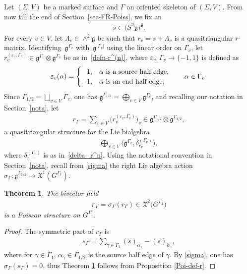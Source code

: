 \documentclass[10pt,a4paper]{amsart}
\numberwithin{equation}{section}
\newtheorem{Theorem}{Theorem}[section]
\newcommand{\XX}{\mathfrak{X}}
\def \g {\mathfrak{a}}
\def \g {\mathfrak{g}}
\def \sGam {{\scriptscriptstyle \Gamma}}
\newcommand{\calpha}{\check{\alpha}}
\begin{document}
Let $(\Sigma, V)$ be a marked surface and $\Gamma$ an oriented skeleton of $(\Sigma, V)$. From now till the end of Section~\ref{sec-FR-Poiss}, we f\/ix an
\begin{gather*}
s \in \big(S^2\g\big)^\g.
\end{gather*}
For every $v \in V$, let $\Lambda_v \in \wedge^2 \g$ be such that $r_v = s + \Lambda_v$ is a quasitriangular $r$-matrix. Identi\-fying~$\g^{\sGam_v}$ with~$\g^{|\sGam_v|}$ using the linear order on $\Gamma_v$, let $r_v^{(\varepsilon_v, \sGam_v)} \in \g^{\sGam_v} \otimes \g^{\sGam_v}$ be as in~\eqref{defn-r^(n)}, where $\varepsilon_v\colon \Gamma_v \to \{ -1, 1\}$ is def\/ined as
\begin{gather*}
\varepsilon_v(\alpha) = \begin{cases}
\hphantom{-}1, & \alpha \ \text{is a source half edge}, \\
-1, & \alpha \ \text{is an end half edge},
\end{cases} \qquad \alpha \in \Gamma_v.
\end{gather*}
Since $\Gamma_{1/2} = \bigsqcup_{v \in V} \Gamma_v$, one has $\g^{\sGam_{1/2}} = \bigoplus_{v \in V} \g^{\sGam_v}$, and recalling our notation in Section~\ref{nota}, let
\begin{gather}
r_{\sGam} = \sum_{v \in V} \big( r_v^{(\varepsilon_v, \sGam_v)} \big)_v \in \g^{\sGam_{1/2}} \otimes \g^{\sGam_{1/2}}, \label{defn-r_sgam}
\end{gather}
a quasitriangular structure for the Lie bialgebra
\begin{gather*}
\bigoplus_{v \in V} \big( \g^{\sGam_v}, \delta_{r_v}^{(\sGam_v)} \big), %
\end{gather*}
where $\delta_{r_v}^{(\sGam_v)}$ is as in~\eqref{delta_r^n}. Using the notational convention in Section~\ref{nota}, recall from \eqref{sigma} the right Lie algebra action $\sigma_{\sGam}\colon \g^{\sGam_{1/2}} \to \XX^1(G^{\Gamma_1})$.


\begin{Theorem} \label{main-thm}
The bivector field
\begin{gather*}
\pi_{\sGam} = \sigma_{\sGam}(r_{\sGam}) \in \XX^2\big(G^{\Gamma_1}\big) %
\end{gather*}
is a Poisson structure on $G^{\Gamma_1}$.
\end{Theorem}



\begin{proof}
The symmetric part of $r_{\sGam}$ is
\begin{gather*}
s_{\sGam} = \sum_{\gamma \in \Gamma_1} (s)_{\alpha_\gamma} - (s)_{\calpha_\gamma},
\end{gather*}
where for $\gamma \in \Gamma_1$, $\alpha_\gamma \in \Gamma_{1/2}$ is the source half edge of $\gamma$. By \eqref{sigma}, one has $\sigma_{\sGam} (s_{\sGam}) = 0$, thus Theorem \ref{main-thm} follows from Proposition \ref{Poi-def-r}.
\end{proof}
\end{document}
